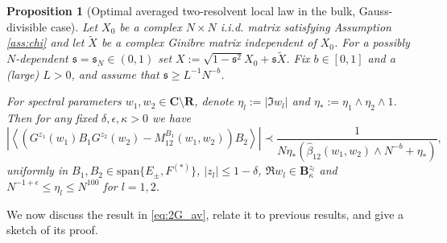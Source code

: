 \documentclass[10pt]{amsart}
\newtheorem{proposition}[theorem]{Proposition}
\numberwithin{equation}{section}
\newcommand{\R}{\mathbf{R}}
\newcommand{\C}{\mathbf{C}}
\begin{document}
\begin{proposition}[Optimal averaged two-resolvent local law in the bulk, Gauss-divisible case]\label{prop:2G_av} Let $X_0$ be a complex $N\times N$ i.i.d. matrix satisfying Assumption \ref{ass:chi} and let $\widetilde{X}$ be a complex Ginibre matrix independent of $X_0$. For a possibly $N$-dependent $\mathfrak{s}=\mathfrak{s}_N\in (0,1)$ set $X:=\sqrt{1-\mathfrak{s}^2}X_0+\mathfrak{s}\widetilde{X}$. Fix $b\in [0,1]$ and a (large) $L>0$, and assume that $\mathfrak{s}\ge L^{-1} N^{-b}$.

For spectral parameters $w_1,w_2\in\C\setminus\R$, denote $\eta_l:=|\Im w_l|$ and $\eta_*:=\eta_1\wedge \eta_2\wedge 1$.  Then for any fixed $\delta,\epsilon,\kappa>0$ we have
\begin{equation}
\left\vert \left\langle \left(G^{z_1}(w_1)B_1G^{z_2}(w_2)-M_{12}^{B_1}(w_1,w_2)\right)B_2\right\rangle\right\vert \prec \frac{1}{N\eta_*\left(\widehat{\beta}_{12}(w_1,w_2)\wedge N^{-b} + \eta_*\right)},
\label{eq:2G_av}
\end{equation}  
uniformly in $B_1,B_2\in\mathrm{span}\{E_\pm,F^{(*)}\}$, $|z_l|\le 1-\delta$, $\Re w_l\in\mathbf{B}_\kappa^{z_l}$ and $N^{-1+\epsilon}\le \eta_l\le N^{100}$ for $l=1,2$.
\end{proposition}

We now discuss the result in \eqref{eq:2G_av}, relate it to previous results, and give a sketch of its proof.

\smallskip
\end{document}
